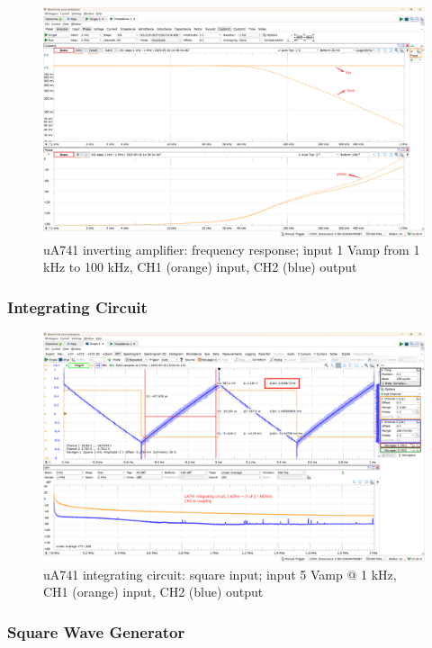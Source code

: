 \documentclass[UTF8]{article}
\begin{document}
\begin{figure}[H]\centering
    \includegraphics[width=\columnwidth]{LCE-06-07-运放设计/assets/uA741/test/inverting 3.png}
    \caption{uA741 inverting amplifier: frequency response; input 1 Vamp from 1 kHz to 100 kHz, CH1 (orange) input, CH2 (blue) output}
\end{figure}

\subsubsection{Integrating Circuit}

\begin{figure}[H]\centering
    \includegraphics[width=\columnwidth]{LCE-06-07-运放设计/assets/uA741/test/integrating 1.png}
    \caption{uA741 integrating circuit: square input; input 5 Vamp @ 1 kHz, CH1 (orange) input, CH2 (blue) output}
\end{figure}

\subsubsection{Square Wave Generator}
\end{document}
